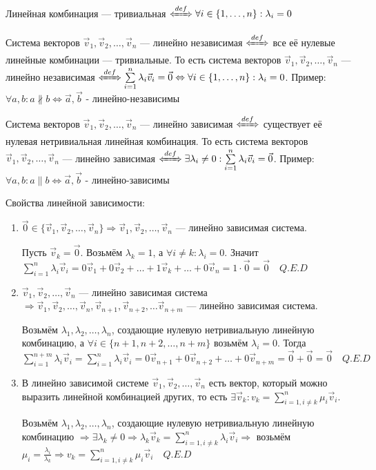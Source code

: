 Линейная комбинация --- тривиальная \(\defLeftrightarrow \forall i \in \{1, \dots, n\}: \lambda_i = 0\)

Система векторов \(\vec v_1, \vec v_2, \dots, \vec v_n\) --- линейно независимая \(\defLeftrightarrow\) все её нулевые линейные комбинации --- тривиальные. То есть система векторов \(\vec v_1, \vec v_2, \dots, \vec v_n\) --- линейно независимая \(\defLeftrightarrow \sum\limits_{i = 1}^{n} \lambda_i \vec v_i = \vec 0 \Leftrightarrow \forall i \in \{1, \dots, n\}: \lambda_i = 0\). Пример: \(\forall a, b : a \nparallel b \Leftrightarrow \vec a, \vec b\) - линейно-независимы

Система векторов \(\vec v_1, \vec v_2, \dots, \vec v_n\) --- линейно зависимая \(\defLeftrightarrow\) существует её нулевая нетривиальная линейная комбинация. То есть система векторов \(\vec v_1, \vec v_2, \dots, \vec v_n\) --- линейно зависимая \(\defLeftrightarrow \exists \lambda_i \neq 0:\sum\limits_{i = 1}^{n} \lambda_i \vec v_i = \vec 0\). Пример: \(\forall a, b : a \parallel b\Leftrightarrow \vec a, \vec b\) - линейно-зависимы

Свойства линейной зависимости:
\begin{enumerate}
    \item \(\vec 0 \in \{\vec v_1, \vec v_2, \dots, \vec v_n\} \Rightarrow \vec v_1, \vec v_2, \dots, \vec v_n\) --- линейно зависимая система.

          Пусть \(\vec v_k = \vec 0\). Возьмём \(\lambda_k = 1\), а \(\forall i \neq k: \lambda_i = 0\). Значит \(\sum\limits_{i = 1}^{n} \lambda_i \vec v_i = 0 \vec v_1 + 0 \vec v_2 + \dots + 1 \vec v_k + \dots + 0 \vec v_n = 1 \cdot \vec 0 = \vec 0 \quad Q.E.D\)

    \item \(\vec v_1, \vec v_2, \dots, \vec v_n\) --- линейно зависимая система \(\Rightarrow \vec v_1, \vec v_2, \dots, \vec v_n, \vec v_{n + 1}, \vec v_{n + 2}, \dots \vec v_{n + m}\) --- линейно зависимая система.

          Возьмём \(\lambda_1, \lambda_2, \dots, \lambda_n\), создающие нулевую нетривиальную линейную комбинацию, а \(\forall i \in \{n + 1, n + 2, \dots, n + m\}\) возьмём \(\lambda_i = 0\). Тогда \(\sum\limits_{i = 1}^{n + m} \lambda_i \vec v_i = \sum\limits_{i = 1}^{n} \lambda_i \vec v_i = 0 \vec v_{n + 1} + 0 \vec v_{n + 2} + \dots + 0 \vec v_{n + m} = \vec 0 + \vec 0 = \vec 0 \quad Q.E.D\)\\

    \item В линейно зависимой системе \(\vec v_1, \vec v_2, \dots, \vec v_n\) есть вектор, который можно выразить линейной комбинацией других, то есть \(\exists \vec v_k: v_k = \sum\limits_{i = 1, i \neq k}^{n} \mu_i \vec v_i\).

          Возьмём \(\lambda_1, \lambda_2, \dots, \lambda_n\), создающие нулевую нетривиальную линейную комбинацию \(\Rightarrow \exists \lambda_k \neq 0 \Rightarrow \lambda_k \vec v_k = \sum\limits_{i = 1, i \neq k}^{n} \lambda_i \vec v_i \Rightarrow\) возьмём \(\mu_i = \frac{\lambda_i}{\lambda_k} \Rightarrow v_k = \sum\limits_{i = 1, i \neq k}^{n} \mu_i \vec v_i \quad Q.E.D\)

\end{enumerate}

